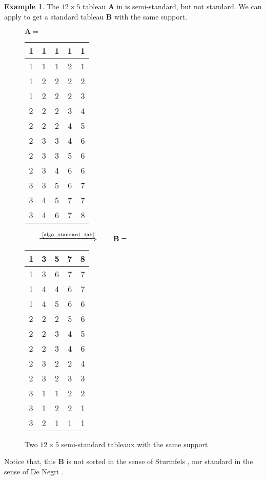 \documentclass[11pt,a4paper,reqno,dvipsnames]{amsart}
\theoremstyle{plain}
\theoremstyle{definition}
\newtheorem{Assumptions and Discussion}[Theorem]{Assumptions and Discussion}
\newtheorem{Example}[Theorem]{Example}
\theoremstyle{remark}
\newcommand\bfA{\mathbf{A}}
\newcommand\bfB{\mathbf{B}}
\begin{document}
\begin{Example}
    The $12 \times 5$ tableau $\bfA$ in  is semi-standard, but not standard. We can apply  to get a standard tableau $\bfB$ with the same support.
    \begin{figure}[h]
        $\bfA=$
        \begin{tabular}{|c|c|c|c|c|}
            \hline
            1&1&1&1&1\\ \hline
            1&1&1&2&1\\ \hline
            1&2&2&2&2\\ \hline
            1&2&2&2&3\\ \hline
            2&2&2&3&4\\ \hline
            2&2&2&4&5\\ \hline
            2&3&3&4&6\\ \hline
            2&3&3&5&6\\ \hline
            2&3&4&6&6\\ \hline
            3&3&5&6&7\\ \hline
            3&4&5&7&7\\ \hline
            3&4&6&7&8\\ \hline
        \end{tabular}$ \qquad \xLongrightarrow{\text{\Cref{algo_standard_tab}}} \qquad \bfB=$
        \begin{tabular}{|c|c|c|c|c|}
            \hline
            1 & 3 & 5 & 7 & 8\\
            \hline
            1 & 3 & 6 & 7 & 7\\
            \hline
            1 & 4 & 4 & 6 & 7\\
            \hline
            1 & 4 & 5 & 6 & 6\\
            \hline
            2 & 2 & 2 & 5 & 6\\
            \hline
            2 & 2 & 3 & 4 & 5\\
            \hline
            2 & 2 & 3 & 4 & 6\\
            \hline
            2 & 3 & 2 & 2 & 4\\
            \hline
            2 & 3 & 2 & 3 & 3\\
            \hline
            3 & 1 & 1 & 2 & 2 \\
            \hline
            3 & 1 & 2 & 2 & 1 \\
            \hline
            3 & 2 & 1 & 1 & 1\\
            \hline
        \end{tabular}
        \caption{Two $12 \times 5$ semi-standard tableaux with the same support}
        \label{tab:standard}     
    \end{figure}
    Notice that, this $\bfB$ is not sorted in the sense of Sturmfels \cite{Sturmfels}, nor standard in the sense of De Negri \cite{DeNegri}.
\end{Example}
\end{document}
